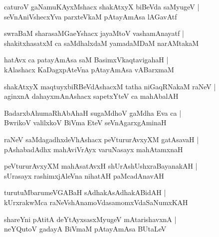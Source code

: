 \documentclass[twoside,12pt,openright]{book}
\newcounter{shloka}[chapter]
\begin{document}
\begin{shloka}%
caturoV gaNamuKAyxMshacx shakAtxyX biBeVda saMyugeV |\\
seVnAniVshecxYva parxteVkaM pAtayAmAsa lAGavAtf
\end{shloka}

\begin{shloka}%
swraBaM sharasaMGaeYshacx jayaMtoV vashamAnayatf |\\
shakitxhasatxM ca saMdhalxdaM yamadaMDaM narAMtakaM
\end{shloka}

\begin{shloka}%
hatAvx ca patayAmAsa saM BasimxVkaqtavigahaH |\\
kAlashacx KaDagxpAteVna pAtayAmAsa vABarxmaM 
\end{shloka}

\begin{shloka}%
shakAtxyX maqtuyxbiRBeVdAshacxM tatha niGaqRNakaM raNeV |\\
aginxnA dahayxmAnAshacx sapetxYteV ca mahAbalAH
\end{shloka}

\begin{shloka}%
BadarxbAhumaRhAbAhaH  sugaMdhoV gaMdha Eva ca |\\
BwrikoV valilxkoV BiVma EteV seVnAgarxgAminaH 
\end{shloka}

\begin{shloka}%
raNeV saMdagadhxdeVhAshacx peVtururAvxyXM gatAsavaH |\\
pAshabadAdhx mahAviVrAyx varuNasayx mahAtamxnaH 
\end{shloka}

\begin{shloka}%
peVtururAvxyXM mahAsatAvxH shUrAshUshxraBayanakAH |\\
sUrasayx rashimxjAleVna nihatAH paMcadAnavAH 
\end{shloka}

\begin{shloka}%
turutuMbarumeVGABaH sAdhakAsAdhakABidAH |\\
kUrxrakwMca raNeVshAnamoVdasamomxVdaSaNumxKAH
\end{shloka}

\begin{shloka}%
shareYni pAtitA deYtAyxsasxMyugeV mAtarishavxnA |\\
neYQutoV gadayA BiVmaM pAtayAmAsa BUtaLeV 
\end{shloka}
\end{document}
